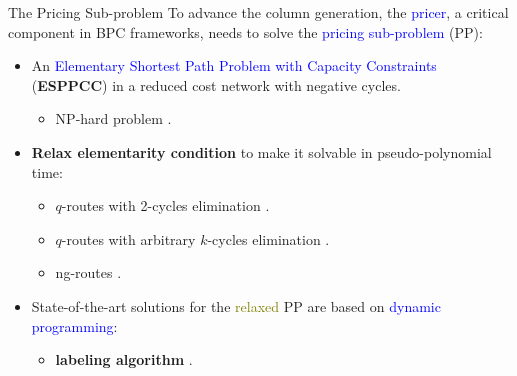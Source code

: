 \begin{frame}{The Pricing Sub-problem}
	To advance the column generation, the \textcolor{blue}{pricer}, a critical component in BPC frameworks, needs to solve the \textcolor{blue}{pricing sub-problem} (PP):
	\begin{itemize}
		\item An \textcolor{blue}{Elementary Shortest Path Problem with Capacity Constraints} (\textbf{ESPPCC}) in a reduced cost network with negative cycles.
		      \begin{itemize}
			      \item NP-hard problem \parencite{dror1994}.
		      \end{itemize}
		\item \textbf{Relax elementarity condition} to make it solvable in pseudo-polynomial time:
		      \begin{itemize}
			      \item $q$-routes with 2-cycles elimination \parencite{christofides1969}.
			      \item $q$-routes with arbitrary $k$-cycles elimination \parencite{christofides1969}.
			      \item ng-routes \parencite{baldacci2011}.
		      \end{itemize}
		\item State-of-the-art solutions for the \textcolor{olive}{relaxed} PP are based on \textcolor{blue}{dynamic programming}:
		      \begin{itemize}
			      \item \textbf{labeling algorithm} \parencite{desrochers1992, feillet2004}.
		      \end{itemize}
	\end{itemize}
\end{frame}
